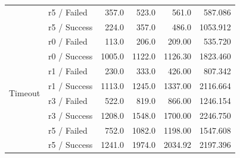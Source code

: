 \begin{table}[htbp]
\begin{tabular}{llrrrr}
		& r5 / Failed
		& 357.0 & 523.0 & 561.0 & 587.086 \\
		& r5 / Success
		& 224.0 & 357.0 & 486.0 & 1053.912 \\

		\midrule

		\multirow{10}{*}{Timeout}
		& r0 / Failed
		& 113.0 & 206.0 & 209.00 & 535.720 \\
		& r0 / Success
		& 1005.0 & 1122.0 & 1126.30 & 1823.460 \\

		& r1 / Failed
		& 230.0 & 333.0 & 426.00 & 807.342 \\
		& r1 / Success
		& 1113.0 & 1245.0 & 1337.00 & 2116.664 \\

		& r3 / Failed
		& 522.0 & 819.0 & 866.00 & 1246.154 \\
		& r3 / Success
		& 1208.0 & 1548.0 & 1700.00 & 2246.750 \\

		& r5 / Failed
		& 752.0 & 1082.0 & 1198.00 & 1547.608 \\
		& r5 / Success
		& 1241.0 & 1974.0 & 2034.92 & 2197.396 \\

		\bottomrule
	\end{tabular}
\end{table}